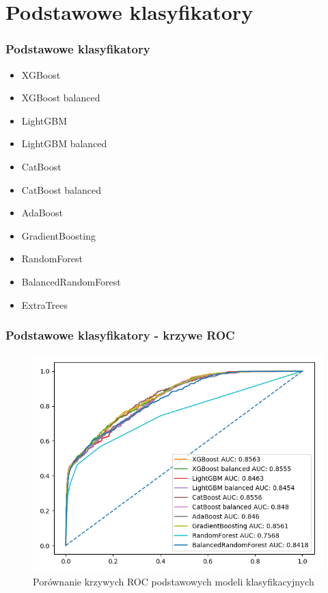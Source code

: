 \documentclass{beamer}
\begin{document}
    \section{Podstawowe klasyfikatory}

    \begin{frame}
        \frametitle{Podstawowe klasyfikatory}
        \begin{itemize}
            \item XGBoost
            \item XGBoost balanced
            \item LightGBM
            \item LightGBM balanced
            \item CatBoost
            \item CatBoost balanced
            \item AdaBoost
            \item GradientBoosting
            \item RandomForest
            \item BalancedRandomForest
            \item ExtraTrees
        \end{itemize}
    \end{frame}

    \begin{frame}
        \frametitle{Podstawowe klasyfikatory - krzywe ROC}
        \begin{figure}
            \centering
            \includegraphics[width=0.8\linewidth]{../images/roc-comparison.png}
            \caption{Porównanie krzywych ROC podstawowych modeli klasyfikacyjnych}
            \label{fig:roc-comparison}
        \end{figure}
    \end{frame}
\end{document}
